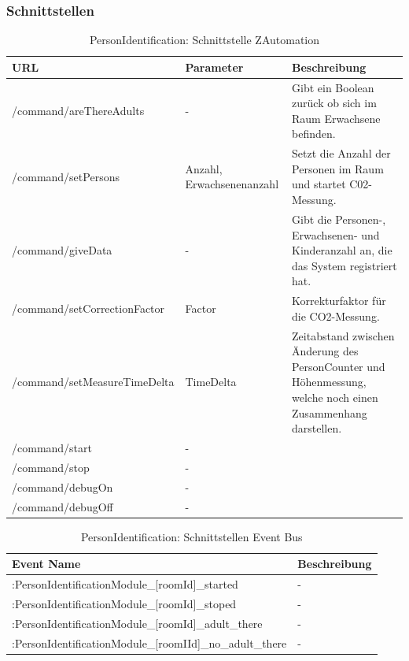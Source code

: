 \subsubsection{Schnittstellen}
\begin{table}[H]
	\begin{tabularx}{\textwidth}{
			>{\hsize=1.25\hsize}X %
			>{\hsize=0.5\hsize\centering}X %
			>{\hsize=1.25\hsize}X %
		}
		\hline
		\textbf{URL}						& \textbf{Parameter}	& \textbf{Beschreibung} \\
		\hline 
		/command/areThereAdults				
		& - 	
		& Gibt ein Boolean zurück ob sich im Raum Erwachsene befinden. \\ 
		\hline 
		/command/setPersons		
		& Anzahl, Erwachsenenanzahl		%
		& Setzt die Anzahl der Personen im Raum und startet C02-Messung. \\
		\hline 
		/command/giveData
		& - 				
		& Gibt die Personen-, Erwachsenen- und Kinderanzahl an, die das System registriert hat. \\
		\hline
		/command/setCorrectionFactor
		& Factor
		& Korrekturfaktor für die CO2-Messung. \\
		\hline
		/command/setMeasureTimeDelta
		& TimeDelta
		& Zeitabstand zwischen Änderung des PersonCounter und Höhenmessung, welche noch einen Zusammenhang darstellen. \\
		\hline
		/command/start
		& -
		& \\
		\hline
		/command/stop
		& - 
		& \\
		\hline
		/command/debugOn
		& - 
		& \\
		\hline
		/command/debugOff
		& - 
		& \\
		\hline
	\end{tabularx}
	\caption{PersonIdentification: Schnittstelle ZAutomation}
\end{table}

\begin{table}[H]
	\begin{tabularx}{\textwidth}{
			>{\hsize=1.2\hsize}X 
			>{\hsize=0.8\hsize}X
		}
		\hline
		\textbf{Event Name}						& \textbf{Beschreibung} \\ %
		\hline
		[deviceId]:PersonIdentificationModule\_[roomId]\_started	
		& - \\
		\hline 
		[deviceId]:PersonIdentificationModule\_[roomId]\_stoped
		& - \\
		\hline
		[deviceId]:PersonIdentificationModule\_[roomId]\_adult\_there
		& - \\
		\hline
		[deviceId]:PersonIdentificationModule\_[roomIId]\_no\_adult\_there
		& - \\
		\hline
	\end{tabularx}
	\caption{PersonIdentification: Schnittstellen Event Bus}
\end{table}

